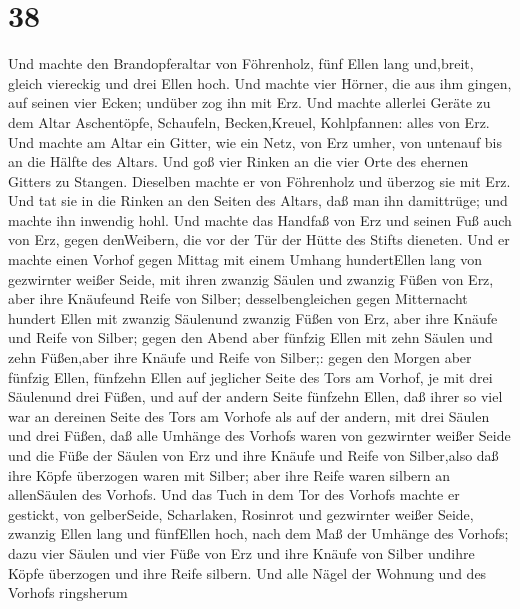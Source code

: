 \hypertarget{section-37}{%
\section{38}\label{section-37}}

 Und machte den Brandopferaltar von Föhrenholz, fünf Ellen
lang und,breit, gleich viereckig und drei Ellen hoch.  Und
machte vier Hörner, die aus ihm gingen, auf seinen vier Ecken; undüber
zog ihn mit Erz.  Und machte allerlei Geräte zu dem Altar
Aschentöpfe, Schaufeln, Becken,Kreuel, Kohlpfannen: alles von Erz.
 Und machte am Altar ein Gitter, wie ein Netz, von Erz
umher, von untenauf bis an die Hälfte des Altars.  Und goß
vier Rinken an die vier Orte des ehernen Gitters zu Stangen.
 Dieselben machte er von Föhrenholz und überzog sie mit Erz.
 Und tat sie in die Rinken an den Seiten des Altars, daß man
ihn damittrüge; und machte ihn inwendig hohl.  Und machte
das Handfaß von Erz und seinen Fuß auch von Erz, gegen denWeibern, die
vor der Tür der Hütte des Stifts dieneten.  Und er machte
einen Vorhof gegen Mittag mit einem Umhang hundertEllen lang von
gezwirnter weißer Seide,  mit ihren zwanzig Säulen und
zwanzig Füßen von Erz, aber ihre Knäufeund Reife von Silber;
 desselbengleichen gegen Mitternacht hundert Ellen mit
zwanzig Säulenund zwanzig Füßen von Erz, aber ihre Knäufe und Reife von
Silber;  gegen den Abend aber fünfzig Ellen mit zehn Säulen
und zehn Füßen,aber ihre Knäufe und Reife von Silber;: 
gegen den Morgen aber fünfzig Ellen,  fünfzehn Ellen auf
jeglicher Seite des Tors am Vorhof, je mit drei Säulenund drei Füßen,
 und auf der andern Seite fünfzehn Ellen, daß ihrer so viel
war an dereinen Seite des Tors am Vorhofe als auf der andern, mit drei
Säulen und drei Füßen,  daß alle Umhänge des Vorhofs waren
von gezwirnter weißer Seide  und die Füße der Säulen von
Erz und ihre Knäufe und Reife von Silber,also daß ihre Köpfe überzogen
waren mit Silber; aber ihre Reife waren silbern an allenSäulen des
Vorhofs.  Und das Tuch in dem Tor des Vorhofs machte er
gestickt, von gelberSeide, Scharlaken, Rosinrot und gezwirnter weißer
Seide, zwanzig Ellen lang und fünfEllen hoch, nach dem Maß der Umhänge
des Vorhofs;  dazu vier Säulen und vier Füße von Erz und
ihre Knäufe von Silber undihre Köpfe überzogen und ihre Reife silbern.
 Und alle Nägel der Wohnung und des Vorhofs ringsherum
